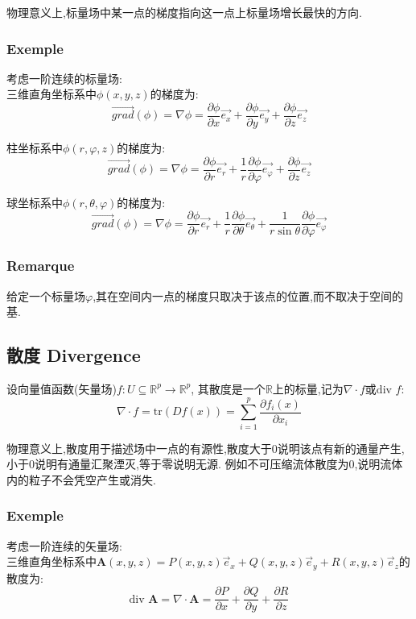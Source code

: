 \documentclass[12pt, a4paper, oneside]{ctexbook}
\newcommand{\R }{\mathbb{R}}%
\begin{document}
    物理意义上,标量场中某一点的梯度指向这一点上标量场增长最快的方向.
    \subsubsection{Exemple}
    考虑一阶连续的标量场:\\


    三维直角坐标系中$\phi(x,y,z)$的梯度为:
    $$
    \overrightarrow{grad} (\phi)=\nabla \phi=\frac{\partial \phi}{\partial x}\overrightarrow{e_x}+\frac{\partial \phi}{\partial y}\overrightarrow{e_y}+\frac{\partial \phi}{\partial z}\overrightarrow{e_z}
    $$

    柱坐标系中$\phi(r,\varphi ,z)$的梯度为:
    $$
    \overrightarrow{grad} (\phi)=\nabla \phi=\frac{\partial \phi}{\partial r}\overrightarrow{e_r}+\frac{1}{r}\frac{\partial \phi}{\partial \varphi}\overrightarrow{e_\varphi}+\frac{\partial \phi}{\partial z}\overrightarrow{e_z}
    $$

    球坐标系中$\phi(r,\theta,\varphi)$的梯度为:
    $$
      \overrightarrow{grad} (\phi)=\nabla \phi=\frac{\partial \phi}{\partial r}\overrightarrow{e_r}+\frac{1}{r}\frac{\partial \phi}{\partial \theta}\overrightarrow{e_\theta}+\frac{1}{r\sin\theta}\frac{\partial \phi}{\partial \varphi}\overrightarrow{e_\varphi}
    $$
    \subsubsection{Remarque}
    给定一个标量场$\varphi$,其在空间内一点的梯度只取决于该点的位置,而不取决于空间的基.
  \subsection{散度 Divergence}
    设向量值函数(矢量场)$f:U\subseteq \R^p \rightarrow \R^p$,
    其散度是一个$\R$上的标量,记为$\nabla \cdot f$或$\text{div }f$:
    $$
      \nabla \cdot f=\text{tr}(Df(x))=\sum_{i=1}^{p}\frac{\partial f_i(x)}{\partial x_i}
    $$

    物理意义上,散度用于描述场中一点的有源性,散度大于0说明该点有新的通量产生,小于0说明有通量汇聚湮灭,等于零说明无源.
    例如不可压缩流体散度为0,说明流体内的粒子不会凭空产生或消失.
    \subsubsection{Exemple}
    考虑一阶连续的矢量场:\\


    三维直角坐标系中$\textbf{A}(x,y,z)=P(x,y,z)\vec{e}_x+Q(x,y,z)\vec{e}_y+R(x,y,z)\vec{e}_z$的散度为:
    $$
      \text{div } \textbf{A}=\nabla \cdot \textbf{A}=\frac{\partial P}{\partial x}+\frac{\partial Q}{\partial y}+\frac{\partial R}{\partial z}
    $$
\end{document}
